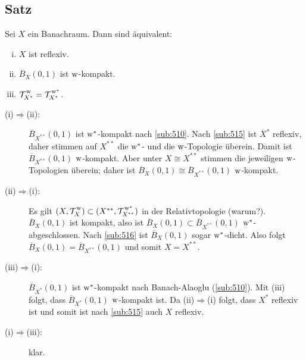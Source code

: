 \subsection[Satz: Äquivalenzen zu: $X$ ist reflexiv]{Satz} %
\label{sub:518}
Sei $X$ ein Banachraum. Dann sind äquivalent: 
\begin{enumerate}[(i)]
	\item $X$ ist reflexiv.
	\item $\overline{B}_X(0,1)$ ist $\mathrm{w}$-kompakt.
	\item $\weakT{X^*}= \weakTstar{X^*}$.
\end{enumerate}
\begin{description}
	\item[(i)$\Rightarrow$(ii):] $\overline{B}_{X^{**}}(0,1)$ ist $\mathrm{w}^*$-kompakt nach \ref{sub:510}. Nach \ref{sub:515} ist $X^*$ reflexiv, daher stimmen auf $X^{**}$
	die $\mathrm{w}^*$- und die $\mathrm{w}$-Topologie überein. Damit ist $ \overline{B}_{X^{**}}(0,1)$ $\mathrm{w}$-kompakt. Aber unter $X \cong X^{**}$ stimmen die jeweiligen $\mathrm{w}$-Topologien
	überein; daher ist $\overline{B}_{X}(0,1) \cong \overline{B}_{X^{**}}(0,1)$ $\mathrm{w}$-kompakt.
	\item[(ii)$\Rightarrow$(i):] Es gilt $(X,\weakT{X}) \subset (X^{**}, \weakTstar{X^{**}})$ in der Relativtopologie (warum?).
	$\overline{B}_X(0,1)$ ist kompakt, also ist $\overline{B}_X(0,1) \subset \overline{B}_{X^{**}}(0,1)$ $\mathrm{w}^*$-abgeschlossen. Nach \ref{sub:516} ist $\overline{B}_X(0,1)$ 
	sogar $\mathrm{w}^*$-dicht. Also folgt $\overline{B}_X(0,1) = \overline{B}_{X^{**}}(0,1)$ und somit $X=X^{**}$.
	\item[(iii)$\Rightarrow$(i):] $\overline{B}_{X^*}(0,1)$ ist $\mathrm{w}^*$-kompakt nach Banach-Alaoglu (\ref{sub:510}). Mit (iii) folgt, dass $\overline{B}_{X^*}(0,1)$
	$\mathrm{w}$-kompakt ist. Da (ii)$\Rightarrow$(i) folgt, dass $X^*$ reflexiv ist und somit ist nach \ref{sub:515} auch $X$ reflexiv.
	\item[(i)$\Rightarrow$(iii):] klar. \bewende
\end{description}

